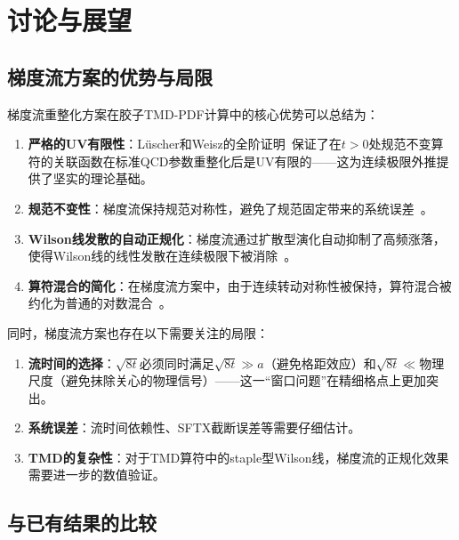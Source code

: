\documentclass[12pt,a4paper]{ctexart}
\theoremstyle{definition}
\begin{document}

\section{讨论与展望}

\subsection{梯度流方案的优势与局限}

梯度流重整化方案在胶子TMD-PDF计算中的核心优势可以总结为：

\begin{enumerate}[leftmargin=*]
    \item \textbf{严格的UV有限性}：L\"uscher和Weisz的全阶证明~\cite{LuscherWeisz2011}保证了在$t>0$处规范不变算符的关联函数在标准QCD参数重整化后是UV有限的——这为连续极限外推提供了坚实的理论基础。
    \item \textbf{规范不变性}：梯度流保持规范对称性，避免了规范固定带来的系统误差~\cite{Zhang2024gauge_fixing}。
    \item \textbf{Wilson线发散的自动正规化}：梯度流通过扩散型演化自动抑制了高频涨落，使得Wilson线的线性发散在连续极限下被消除~\cite{MonahanOrginos2017}。
    \item \textbf{算符混合的简化}：在梯度流方案中，由于连续转动对称性被保持，算符混合被约化为普通的对数混合~\cite{Monahan2018}。
\end{enumerate}

同时，梯度流方案也存在以下需要关注的局限：
\begin{enumerate}[leftmargin=*]
    \item \textbf{流时间的选择}：$\sqrt{8t}$必须同时满足$\sqrt{8t} \gg a$（避免格距效应）和$\sqrt{8t} \ll$物理尺度（避免抹除关心的物理信号）——这一``窗口问题''在精细格点上更加突出。
    \item \textbf{系统误差}：流时间依赖性、SFTX截断误差等需要仔细估计。
    \item \textbf{TMD的复杂性}：对于TMD算符中的staple型Wilson线，梯度流的正规化效果需要进一步的数值验证。
\end{enumerate}

\subsection{与已有结果的比较}
\end{document}
